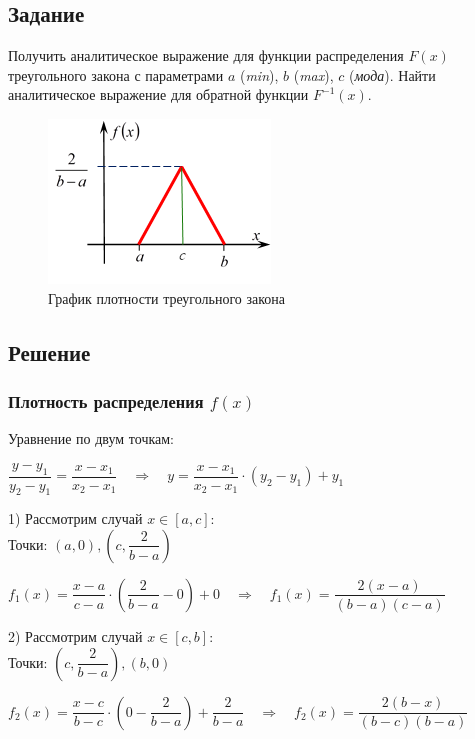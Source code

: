 \documentclass[14pt,fleqn]{extarticle}
\begin{document}
    \subsection*{Задание}
    Получить аналитическое выражение для функции распределения $F(x)$ треугольного закона с параметрами $a$ (\textit{min}), $b$ (\textit{max}), $c$ (\textit{мода}). Найти аналитическое выражение для обратной функции $F^{-1}(x)$.
    \begin{figure}[h]
        \centering \includegraphics[scale=0.8]{plot}
        \caption{График плотности треугольного закона}
    \end{figure}
    \subsection*{Решение}
    \subsubsection*{Плотность распределения $f(x)$}
    Уравнение по двум точкам:
    \begin{center}
        $\dfrac{y-y_1}{y_2-y_1} = \dfrac{x-x_1}{x_2-x_1} \quad \Rightarrow \quad y = \dfrac{x-x_1}{x_2-x_1} \cdot (y_2-y_1) + y_1$
    \end{center}
    
    1) Рассмотрим случай $x \in [a, c]$:\\
    \newline
    Точки: $\left(a, 0\right), \left(c, \dfrac{2}{b-a}\right)$
    \begin{center}
        $f_1(x) = \dfrac{x-a}{c-a} \cdot \left(\dfrac{2}{b-a} - 0\right) + 0 \quad \Rightarrow \quad f_1(x) = \dfrac{2(x-a)}{(b-a)(c-a)}$
    \end{center}
    
    2) Рассмотрим случай $x \in [c, b]$:\\
    \newline
    Точки: $\left(c, \dfrac{2}{b-a}\right), \left(b, 0\right)$
    \begin{center}
        $f_2(x) = \dfrac{x-c}{b-c} \cdot \left(0 - \dfrac{2}{b-a}\right) + \dfrac{2}{b-a} \quad \Rightarrow \quad f_2(x) = \dfrac{2(b-x)}{(b-c)(b-a)}$
    \end{center}
\end{document}
